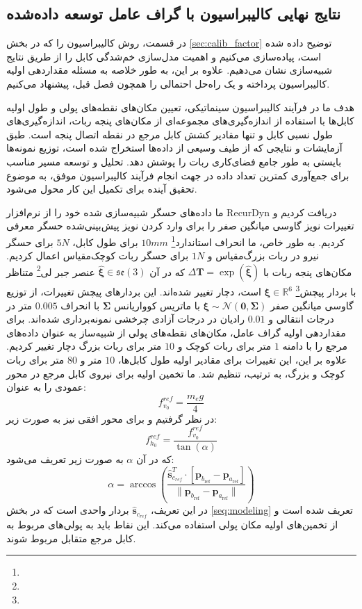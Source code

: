 \subsection{نتایج نهایی کالیبراسیون با گراف عامل توسعه‌ داده‌شده}
در قسمت، روش کالیبراسیون را که در بخش 
\ref{sec:calib_factor}
توضیح داده شده است، پیاده‌سازی می‌کنیم و اهمیت مدل‌سازی خم‌شدگی کابل را از طریق نتایج شبیه‌سازی نشان می‌دهیم. علاوه بر این، به طور خلاصه به مسئله مقداردهی اولیه کالیبراسیون پرداخته و یک راه‌حل احتمالی را همچون فصل قبل، پیشنهاد می‌کنیم.

هدف ما در فرآیند کالیبراسیون سینماتیکی، تعیین مکان‌های نقطه‌های پولی و طول اولیه کابل‌ها با استفاده از اندازه‌گیری‌های مجموعه‌ای از مکان‌های پنجه ربات، اندازه‌گیری‌های طول نسبی کابل و تنها مقادیر کشش کابل مرجع در نقطه اتصال پنجه است. طبق آزمایشات و نتایجی که از طیف وسیعی از داده‌ها استخراج شده است، توزیع نمونه‌ها بایستی به طور جامع فضای‌کاری ربات را پوشش دهد. تحلیل و توسعه مسیر مناسب برای جمع‌آوری کمترین تعداد داده در جهت انجام فرآیند کالیبراسیون موفق، به موضوع تحقیق آینده برای تکمیل این کار محول می‌شود.

ما داده‌های حسگر شبیه‌سازی شده خود را از نرم‌افزار RecurDyn دریافت کردیم و تغییرات نویز گاوسی میانگین صفر را برای وارد کردن نویز پیش‌بینی‌شده حسگر معرفی کردیم. به طور خاص، ما انحراف استاندارد\footnote{} 
$10mm$ 
برای طول کابل، $5N$ برای حسگر نیرو در ربات بزرگ‌مقیاس و $1N$ برای حسگر ربات کوچک‌مقیاس اعمال کردیم. مکان‌های پنجه ربات با $\Delta \mathbf{T} = \exp(\hat{\boldsymbol{\xi}})$ که در آن $\hat{\boldsymbol{\xi}} \in \mathfrak{se}(3)$ عنصر جبر لی\footnote{}
 متناظر با بردار پیچش\footnote{}
  $\boldsymbol{\xi} \in \mathbb{R}^6$
 است، دچار تغییر شده‌اند. این بردارهای پیچش تغییرات، از توزیع گاوسی میانگین صفر $\boldsymbol{\xi}\sim\mathcal{N}(\mathbf{0}, \boldsymbol{\Sigma})$ با ماتریس کوواریانس $\boldsymbol{\Sigma}$ با انحراف $0.005$ متر در درجات انتقالی و $0.01$ رادیان در درجات آزادی چرخشی نمونه‌برداری شده‌اند.
برای مقداردهی اولیه گراف عامل، مکان‌های نقطه‌های پولی از شبیه‌ساز به عنوان داده‌های مرجع را با دامنه $1$ متر برای ربات کوچک و $10$ متر برای  ربات بزرگ دچار تغییر کردیم. علاوه بر این، این تغییرات برای مقادیر اولیه طول کابل‌ها، $10$ متر و $80$ متر برای ربات کوچک و بزرگ، به ترتیب، تنظیم شد. ما تخمین اولیه برای نیروی کابل مرجع در محور عمودی را به عنوان:
\begin{equation}  \label{eq:fv_0}
	f^{{ref}}_{v_0} = \frac{m_eg}{4}
\end{equation}
  در نظر گرفتیم و برای محور افقی نیز به صورت زیر:
\begin{equation}  \label{eq:fh_0}
	f^{ref}_{h_0}=\frac{f^{{ref}}_{v_0}}{\tan(\alpha)} 
\end{equation}
که در آن $\alpha$ به صورت زیر تعریف می‌شود:
\begin{equation}  \label{eq:alpha}
	\alpha = \arccos\left(\frac{\hat{\bm{s}}_{c_{ref}}^T \cdot [\bm{p}_{b_{\text{ref}}} - \bm{p}_{a_{\text{ref}}}]}{\| \bm{p}_{b_{\text{ref}}} - \bm{p}_{a_{\text{ref}}} \|}\right)
\end{equation}
در این تعریف، $\hat{\bm{s}}_{c_{ref}}$ بردار واحدی است که در بخش \ref{seq:modeling} تعریف شده است و از تخمین‌های اولیه مکان پولی استفاده می‌کند. این نقاط باید به پولی‌های مربوط به کابل مرجع متقابل مربوط ‌شوند.


